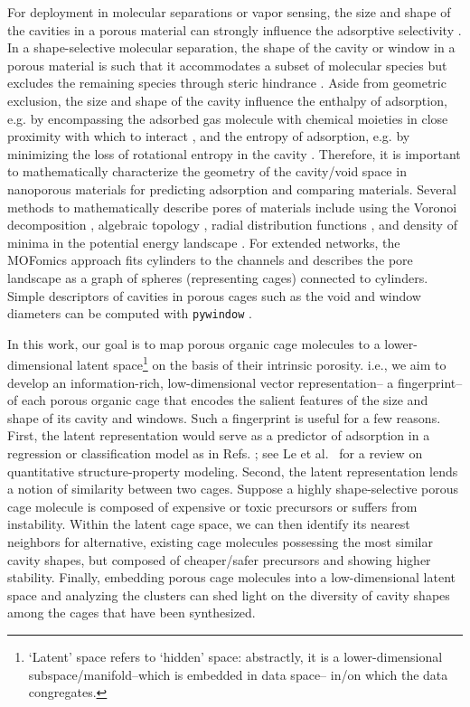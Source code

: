 \documentclass[journal=jacsat,manuscript=article,layout=traditional]{achemso}
\begin{document}
For deployment in molecular separations or vapor sensing, the size and shape of the cavities in a porous material can strongly influence the adsorptive selectivity \cite{mitra2013molecular,zhu1999shape,lee2018high,smit2008towards,sikora2012thermodynamic}. In a shape-selective molecular separation, the shape of the cavity or window in a porous material is such that it accommodates a subset of molecular species but excludes the remaining species through steric hindrance \cite{smit2008towards}. Aside from geometric exclusion, the size and shape of the cavity influence the enthalpy of adsorption, e.g. by encompassing the adsorbed gas molecule with chemical moieties in close proximity with which to interact \cite{simon2015best}, and the entropy of adsorption, e.g. by minimizing the loss of rotational entropy in the cavity \cite{denayer2005rotational}. Therefore, it is important to mathematically characterize the geometry of the cavity/void space in nanoporous materials for predicting adsorption and comparing materials. Several methods to mathematically describe pores of materials include using the Voronoi decomposition \cite{pinheiro2013characterization,martin2011addressing}, algebraic topology \cite{lee2017quantifying}, radial distribution functions \cite{fernandez2013atomic}, and density of minima in the potential energy landscape \cite{oganov2009quantify}. For extended networks, the MOFomics \cite{first2013mofomics} approach fits cylinders to the channels and describes the pore landscape as a graph of spheres (representing cages) connected to cylinders. Simple descriptors of cavities in porous cages such as the void and window diameters can be computed with \texttt{pywindow} \cite{miklitz2018pywindow}.

In this work, our goal is to map porous organic cage molecules to a lower-dimensional latent space\footnote{{\color{red} `Latent' space refers to `hidden' space: abstractly, it is a lower-dimensional subspace/manifold--which is embedded in data space-- in/on which the data congregates.}} on the basis of their intrinsic porosity. i.e., we aim to develop an information-rich, low-dimensional vector representation-- a fingerprint-- of each porous organic cage that encodes the salient features of the size and shape of its cavity and windows. Such a fingerprint is useful for a few reasons. First, the latent representation would serve as a predictor of adsorption in a regression or classification model as in Refs. \cite{bucior2018energy,simon2015best}; see Le et al.~\cite{le2012quantitative} for a review on quantitative structure-property modeling. Second, the latent representation lends a notion of similarity between two cages. Suppose a highly shape-selective porous cage molecule is composed of expensive or toxic precursors or suffers from instability. Within the latent cage space, we can then identify its nearest neighbors for alternative, existing cage molecules possessing the most similar cavity shapes, but composed of cheaper/safer precursors and showing higher stability. Finally, embedding porous cage molecules into a low-dimensional latent space and analyzing the clusters can shed light on the diversity of  cavity shapes among the cages that have been synthesized.
\end{document}
